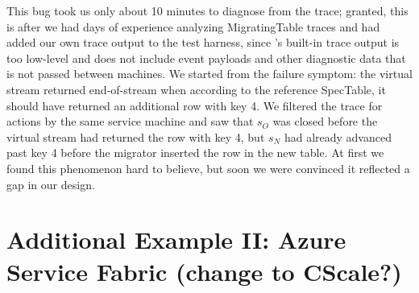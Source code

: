 This bug took us only about 10 minutes to diagnose from the trace; granted, this is after we had days of experience analyzing MigratingTable traces and had added our own trace output to the test harness, since \psharp's built-in trace output is too low-level and does not include event payloads and other diagnostic data that is not passed between machines.  We started from the failure symptom: the virtual stream returned end-of-stream when according to the reference SpecTable, it should have returned an additional row with key 4.  We filtered the trace for actions by the same service machine and saw that $s_O$ was closed before the virtual stream had returned the row with key 4, but $s_N$ had already advanced past key 4 before the migrator inserted the row in the new table.  At first we found this phenomenon hard to believe, but soon we were convinced it reflected a gap in our design.


\section{Additional Example II: Azure Service Fabric (change to CScale?)}
\label{sec:cases:fabric}


